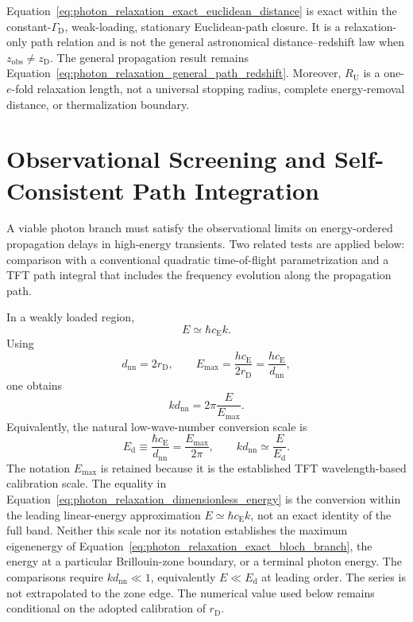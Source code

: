 Equation~\eqref{eq:photon_relaxation_exact_euclidean_distance} is exact within
the constant-\(\Gamma_{\mathrm D}\), weak-loading, stationary Euclidean-path
closure. It is a relaxation-only path relation and is not the general
astronomical distance--redshift law when
\(z_{\mathrm{obs}}\neq z_{\mathrm D}\). The general propagation result remains
Equation~\eqref{eq:photon_relaxation_general_path_redshift}. Moreover,
\(R_{\mathrm U}\) is a one-\(e\)-fold relaxation length, not a universal
stopping radius, complete energy-removal distance, or thermalization boundary.

\section{Observational Screening and Self-Consistent Path Integration}
\label{sec:photon_relaxation_observational_screening}

A viable photon branch must satisfy the observational limits on
energy-ordered propagation delays in high-energy transients. Two related
tests are applied below: comparison with a conventional quadratic
time-of-flight parametrization and a TFT path integral that includes the
frequency evolution along the propagation path.

In a weakly loaded region,
\begin{equation}
    E
    \simeq
    \hbar c_{\mathrm E}k.
    \label{eq:photon_relaxation_energy_wave_number}
\end{equation}
Using
\begin{equation}
    d_{\mathrm{nn}}
    =
    2r_{\mathrm D},
    \qquad
    E_{\mathrm{max}}
    =
    \frac{
        hc_{\mathrm E}
    }{
        2r_{\mathrm D}
    }
    =
    \frac{
        hc_{\mathrm E}
    }{
        d_{\mathrm{nn}}
    },
    \label{eq:photon_relaxation_energy_scale}
\end{equation}
one obtains
\begin{equation}
    kd_{\mathrm{nn}}
    =
    2\pi
    \frac{
        E
    }{
        E_{\mathrm{max}}
    }.
    \label{eq:photon_relaxation_dimensionless_energy}
\end{equation}
Equivalently, the natural low-wave-number conversion scale is
\[
    E_{\mathrm d}
    \equiv
    \frac{
        \hbar c_{\mathrm E}
    }{
        d_{\mathrm{nn}}
    }
    =
    \frac{
        E_{\mathrm{max}}
    }{
        2\pi
    },
    \qquad
    kd_{\mathrm{nn}}
    \simeq
    \frac{E}{E_{\mathrm d}}.
\]
The notation \(E_{\mathrm{max}}\) is retained because it is the established
TFT wavelength-based calibration scale. The equality in
Equation~\eqref{eq:photon_relaxation_dimensionless_energy} is the conversion
within the leading linear-energy approximation
\(E\simeq\hbar c_{\mathrm E}k\), not an exact identity of the full band.
Neither this scale nor its notation establishes the maximum eigenenergy of
Equation~\eqref{eq:photon_relaxation_exact_bloch_branch}, the energy at a
particular Brillouin-zone boundary, or a terminal photon energy. The
comparisons require \(kd_{\mathrm{nn}}\ll1\), equivalently
\(E\ll E_{\mathrm d}\) at leading order. The series is not extrapolated to
the zone edge. The numerical value used below remains conditional on the
adopted calibration of \(r_{\mathrm D}\).

